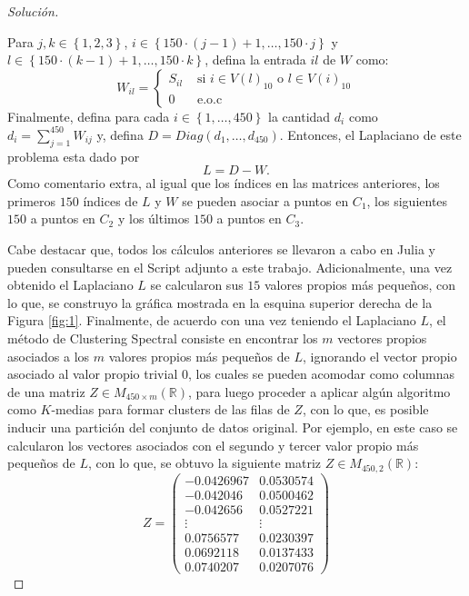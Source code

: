 \documentclass[10.5pt,notitlepage]{article}
\newenvironment{solucion}
  {\begin{proof}[Solución]}
  {\end{proof}}
\newcommand{\RR}{\mathbb{R}}
\newcommand{\kis}[1]{\left\{ #1 \right\}}
\newcommand{\Matrix}[1]{\begin{pmatrix} #1 \end{pmatrix}}
\theoremstyle{plain}
\begin{document}
\begin{solucion}
\begin{itemize}
    Para \(j,k \in \kis{1,2,3}\), \(i \in \kis{150\cdot(j-1) + 1, \hdots, 150\cdot j}\) y \(l \in \kis{150\cdot(k-1) + 1, \hdots, 150\cdot k}\), defina la entrada \(il\) de \(W\) como:  
    \[
    W_{il} =\begin{cases}
        S_{il} & \text{ si } i \in V(l)_{10} \text{ o } l\in V(i)_{10} \\ 
        0 & \text{ e.o.c } 
    \end{cases}
    \]
    Finalmente, defina para cada \(i \in \kis{1, \hdots, 450}\) la cantidad \(d_i\) como
    \(
    d_i = \sum_{j = 1}^{450}W_{ij}
    \)
    y, defina \(D = Diag(d_1, \hdots, d_{450})\). Entonces, el Laplaciano de este problema esta dado por 
    \[
    L = D - W. 
    \]
    Como comentario extra, al igual que los índices en las matrices anteriores, los primeros \(150\) índices de \(L\) y \(W\) se pueden asociar a puntos en \(C_1\), los siguientes \(150\) a puntos en \(C_2\) y los últimos \(150\) a puntos en \(C_3\).
\end{itemize}
Cabe destacar que, todos los cálculos anteriores se llevaron a cabo en Julia y pueden consultarse en el Script adjunto a este trabajo. Adicionalmente, una vez obtenido el Laplaciano \(L\) se calcularon sus \(15\) valores propios más pequeños, con lo que, se construyo la gráfica mostrada en la esquina superior derecha de la Figura \ref{fig:1}. Finalmente, de acuerdo con \textcite{hastie_elements_2009} una vez teniendo el Laplaciano \(L\), el método de Clustering Spectral consiste en encontrar los \(m\) vectores propios asociados a los \(m\) valores propios más pequeños de \(L\), ignorando el vector propio asociado al valor propio trivial \(0\), los cuales se pueden acomodar como columnas de una matriz \(Z \in M_{450\times m}(\RR)\), para luego proceder a aplicar algún algoritmo como \(K\)-medias para formar clusters de las filas de \(Z\), con lo que, es posible inducir una partición del conjunto de datos original. Por ejemplo, en este caso se calcularon los vectores asociados con el segundo y tercer valor propio más pequeños de \(L\), con lo que, se obtuvo la siguiente matriz \(Z\in M_{450, 2}(\RR)\): 
\[
Z = \Matrix{
 -0.0426967&   0.0530574\\
 -0.042046&    0.0500462\\
 -0.042656&    0.0527221\\
     \vdots&     \vdots \\     
  0.0756577&   0.0230397\\
  0.0692118&   0.0137433\\
  0.0740207&   0.0207076
}\]
\end{solucion}
\end{document}
